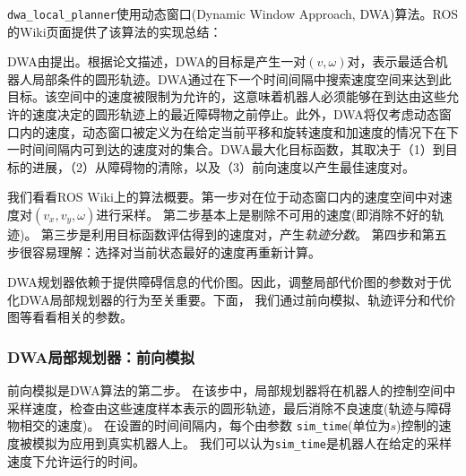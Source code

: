 \texttt{dwa_local_planner}使用动态窗口(Dynamic Window Approach, DWA)算法。ROS的Wiki页面提供了该算法的实现总结：

\begin{center}
	\setlength{\fboxsep}{1em}
\end{center}

DWA由\cite{fox1997dynamic}提出。根据论文描述，DWA的目标是产生一对$(v,\omega)$对，表示最适合机器人局部条件的圆形轨迹。DWA通过在下一个时间间隔中搜索速度空间来达到此目标。该空间中的速度被限制为允许的，这意味着机器人必须能够在到达由这些允许的速度决定的圆形轨迹上的最近障碍物之前停止。此外，DWA将仅考虑动态窗口内的速度，动态窗口被定义为在给定当前平移和旋转速度和加速度的情况下在下一时间间隔内可到达的速度对的集合。DWA最大化目标函数，其取决于（1）到目标的进展，（2）从障碍物的清除，以及（3）前向速度以产生最佳速度对。

我们看看ROS Wiki上的算法概要。第一步对在位于动态窗口内的速度空间中对速度对$(v_x, v_y, \omega)$进行采样。
第二步基本上是剔除不可用的速度(即消除不好的轨迹)。
第三步是利用目标函数评估得到的速度对，产生\emph{轨迹分数}。
第四步和第五步很容易理解：选择对当前状态最好的速度再重新计算。

DWA规划器依赖于提供障碍信息的代价图。因此，调整局部代价图的参数对于优化DWA局部规划器的行为至关重要。下面，
我们通过前向模拟、轨迹评分和代价图等看看相关的参数。


\subsubsection[DWA Local Planner : Forward Simulation]{DWA局部规划器：前向模拟}
前向模拟是DWA算法的第二步。
在该步中，局部规划器将在机器人的控制空间中采样速度，检查由这些速度样本表示的圆形轨迹，最后消除不良速度(轨迹与障碍物相交的速度)。
在设置的时间间隔内，每个由参数 \texttt{sim_time}(单位为$s$)控制的速度被模拟为应用到真实机器人上。
我们可以认为\texttt{sim_time}是机器人在给定的采样速度下允许运行的时间。

